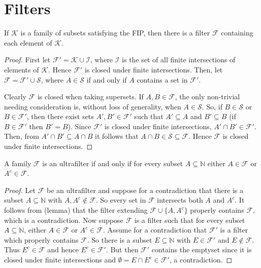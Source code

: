 \section{Filters}
\begin{lemma}
 If \( \mathcal{K}  \) is a family of subsets satisfying the FIP, then there is a filter \(  \mathcal{F}  \) containing each element of \( \mathcal{K}  \).
\end{lemma}
\begin{proof}
	First let \( \mathcal{F}' = \mathcal{K} \cup \mathcal{I}  \), where \( \mathcal{I}  \) is the set of all finite intersections of elements of \( \mathcal{K}  \). Hence \( \mathcal{F} ' \) is closed under finite intersections. Then, let \( \mathcal{F} = \mathcal{F}' \cup \mathcal{S}  \), where \( A \in \mathcal{S}  \) if and only if \( A \) contains a set in \( \mathcal{F} ' \).

	Clearly \( \mathcal{F}  \) is closed when taking supersets. If \( A, B \in \mathcal{F}  \), the only non-trivial needing consideration is, without loss of generality, when \( A \in \mathcal{S}  \). So, if \( B \in \mathcal{S}  \) or \( B \in \mathcal{F} ' \), then there exist sets \( A', B' \in \mathcal{F}'  \) such that \( A' \subseteq A \) and \( B' \subseteq B \) (if \( B \in \mathcal{F} ' \) then \( B' = B \)). Since \( \mathcal{F} ' \) is closed under finite intersections, \( A' \cap B' \in \mathcal{F} ' \). Then, from \( A' \cap B' \subseteq A \cap B \) it follows that \( A \cap B \in \mathcal{S} \subseteq \mathcal{F}  \). Hence \( \mathcal{F}  \) is closed under finite intersections.
\end{proof}
\begin{lemma}
A family \( \mathcal{F}  \) is an ultrafilter if and only if for every subset \( A \subseteq \mathbb{N}  \) either \( A \in \mathcal{F}  \) or \( A^{c} \in \mathcal{F}  \).
\end{lemma}
\begin{proof}
Let \( \mathcal{F}  \) be an ultrafilter and suppose for a contradiction that there is a subset \( A \subseteq \mathbb{N}  \) with \( A, A^{c} \notin \mathcal{F}  \). So every set in \( \mathcal{F}  \) intersects both \( A \) and \( A^{c}  \). It follows from (lemma) that the filter extending \( \mathcal{F} \cup \{ A, A^{c}  \}  \) properly contains \( \mathcal{F}  \), which is a contradiction. Now suppose \( \mathcal{F}  \) is a filter such that for every subset \( A \subseteq \mathbb{N}  \), either \( A \in \mathcal{F}  \) or \( A^{c} \in \mathcal{F}  \). Assume for a contradiction that \( \mathcal{F} ' \) is a filter which properly contains \( \mathcal{F}  \). So there is a subset \( E \subseteq \mathbb{N}  \) with \( E \in \mathcal{F} ' \) and \( E \notin \mathcal{F}  \). Thus \( E^{c} \in \mathcal{F}  \) and hence \( E^{c} \in \mathcal{F} ' \). But then \( \mathcal{F} ' \) contains the emptyset since it is closed under finite intersections and \( \emptyset = E \cap E^{c} \in \mathcal{F} ' \), a contradiction.
\end{proof}
